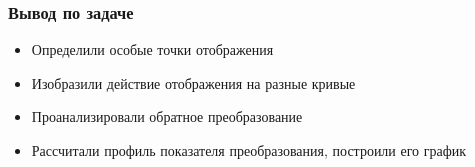 \begin{frame}\frametitle{Вывод по задаче}
	\begin{itemize}
		\item Определили особые точки отображения
		\item Изобразили действие отображения на разные кривые
		\item Проанализировали обратное преобразование
		\item Рассчитали профиль показателя преобразования,
		      построили его график
	\end{itemize}
\end{frame}

